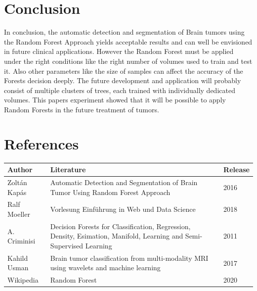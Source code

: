\documentclass[
12pt,
headsepline,
bibliography=totoc,
twoside=semi,
fleqn
]{scrartcl}
\begin{document}
\section{Conclusion\label{sec:sec5}}

 In conclusion, the automatic detection and segmentation of Brain tumors using the Random Forest Approach yields acceptable results and can well be envisioned in future clinical applications. However the Random Forest must be applied under the right conditions like the right number of volumes used to train and test it. Also other parameters like the size of samples can affect the accuracy of the Forests decision deeply. The future development and application will probably consist of multiple clusters of trees, each trained with individually dedicated volumes. This papers experiment showed that it will be possible to apply Random Forests in the future treatment of tumors. 

\newpage
\section{References\label{sec.sec5}}




\begin{table}[H]
 \footnotesize
 \vspace{1ex}
 \centering 
 \begin{tabular}{p{2.5cm}p{8.7cm}p{2.8cm}}
 \toprule
 \textbf{Author} & \textbf{Literature} & \textbf{Release} \\
 \midrule
 Zoltán Kapás & Automatic Detection and Segmentation of Brain Tumor Using Random Forest Approach & 2016 \\
 Ralf Moeller & Vorlesung Einführung in Web und Data Science & 2018 \\
 A. Criminisi & Decision Forests for Classification, Regression, Density, Esimation, Manifold, Learning and Semi-Supervised Learning & 2011 \\
 Kahild Usman & Brain tumor classification from multi-modality MRI using wavelets and machine learning & 2017 \\
 Wikipedia & Random Forest & 2020

 \end{tabular}
 \vspace{2ex}
\end{table}


%
%
\end{document}

